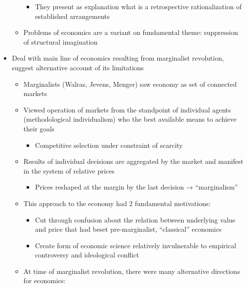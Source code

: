 \begin{itemize}
\begin{itemize}
    \begin{itemize}
    \tightlist
    \item
      They present as explanation what is a retrospective
      rationalization of established arrangements
    \end{itemize}
  \item
    Problems of economics are a variant on fundamental theme:
    suppression of structural imagination
  \end{itemize}
\item
  Deal with main line of economics resulting from marginalist
  revolution, suggest alternative account of its limitations

  \begin{itemize}
  \tightlist
  \item
    Marginalists (Walras, Jevens, Menger) saw economy as set of
    connected markets
  \item
    Viewed operation of markets from the standpoint of individual agents
    (methodological individualism) who the best available means to
    achieve their goals

    \begin{itemize}
    \tightlist
    \item
      Competitive selection under constraint of scarcity
    \end{itemize}
  \item
    Results of individual decisions are aggregated by the market and
    manifest in the system of relative prices

    \begin{itemize}
    \tightlist
    \item
      Prices reshaped at the margin by the last decision →
      ``marginalism''
    \end{itemize}
  \item
    This approach to the economy had 2 fundamental motivations:

    \begin{itemize}
    \tightlist
    \item
      Cut through confusion about the relation between underlying value
      and price that had beset pre-marginalist, ``classical'' economics
    \item
      Create form of economic science relatively invulnerable to
      empirical controversy and ideological conflict
    \end{itemize}
  \item
    At time of marginalist revolution, there were many alternative
    directions for economics:


\end{itemize}
\end{itemize}
